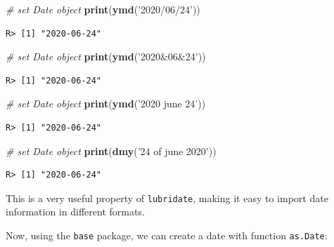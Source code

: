 \documentclass[
  12pt,
]{book}
\newenvironment{Shaded}{\begin{snugshade}}{\end{snugshade}}
\newcommand{\CommentTok}[1]{\textcolor[rgb]{0.37,0.37,0.37}{\textit{#1}}}
\newcommand{\KeywordTok}[1]{\textcolor[rgb]{0.27,0.27,0.27}{\textbf{#1}}}
\newcommand{\NormalTok}[1]{#1}
\newcommand{\StringTok}[1]{\textcolor[rgb]{0.5,0.5,0.5}{#1}}
\begin{document}
\begin{Shaded}
\begin{Highlighting}[]
\CommentTok{# set Date object }
\KeywordTok{print}\NormalTok{(}\KeywordTok{ymd}\NormalTok{(}\StringTok{'2020/06/24'}\NormalTok{))}
\end{Highlighting}
\end{Shaded}

\begin{verbatim}
R> [1] "2020-06-24"
\end{verbatim}

\begin{Shaded}
\begin{Highlighting}[]
\CommentTok{# set Date object }
\KeywordTok{print}\NormalTok{(}\KeywordTok{ymd}\NormalTok{(}\StringTok{'2020&06&24'}\NormalTok{))}
\end{Highlighting}
\end{Shaded}

\begin{verbatim}
R> [1] "2020-06-24"
\end{verbatim}

\begin{Shaded}
\begin{Highlighting}[]
\CommentTok{# set Date object}
\KeywordTok{print}\NormalTok{(}\KeywordTok{ymd}\NormalTok{(}\StringTok{'2020 june 24'}\NormalTok{))}
\end{Highlighting}
\end{Shaded}

\begin{verbatim}
R> [1] "2020-06-24"
\end{verbatim}

\begin{Shaded}
\begin{Highlighting}[]
\CommentTok{# set Date object}
\KeywordTok{print}\NormalTok{(}\KeywordTok{dmy}\NormalTok{(}\StringTok{'24 of june 2020'}\NormalTok{))}
\end{Highlighting}
\end{Shaded}

\begin{verbatim}
R> [1] "2020-06-24"
\end{verbatim}

This is a very useful property of \texttt{lubridate}, making it easy to import date information in different formats.

Now, using the \texttt{base} package, we can create a date with function \texttt{as.Date}:  
\end{document}
